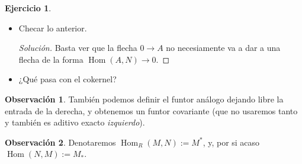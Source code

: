 \documentclass[spanish]{book}
\theoremstyle{definition}
\newtheorem*{obs}{Observación}
\newtheorem*{ejer}{Ejercicio}
\DeclareMathOperator{\Hom}{Hom}
\begin{document}
\begin{ejer}\leavevmode
	\begin{itemize}
		\item Checar lo anterior.
		\begin{proof}[Solución]
			Basta ver que la flecha $0\to A$ no necesiamente va a dar a una flecha de la forma $\Hom(A,N)\to0$.
		\end{proof}
		\item ¿Qué pasa con el cokernel?
	\end{itemize}
\end{ejer}
\begin{obs}
	También podemos definir el funtor análogo dejando libre la entrada de la derecha, y obtenemos un funtor covariante (que no usaremos tanto y también es aditivo exacto \textit{izquierdo}).
\end{obs}
\begin{obs}
	Denotaremos $\Hom_R(M,N):=M^*$, y, por si acaso $\Hom(N,M):=M_*$.
\end{obs}
\end{document}
